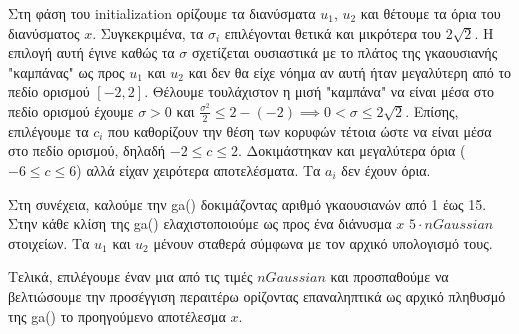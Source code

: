 

Στη φάση του initialization ορίζουμε τα διανύσματα $u_1$, $u_2$ και θέτουμε τα όρια του διανύσματος $x$. 
Συγκεκριμένα, τα $\sigma_{i}$ επιλέγονται θετικά και μικρότερα του $2\sqrt{2}$. 
Η επιλογή αυτή έγινε καθώς τα $\sigma$ σχετίζεται ουσιαστικά με το πλάτος της γκαουσιανής "καμπάνας" ως προς $u_1$ και $u_2$ και δεν θα είχε νόημα αν αυτή ήταν μεγαλύτερη από το πεδίο ορισμού $[-2, 2]$. 
Θέλουμε τουλάχιστον η μισή "καμπάνα" να είναι μέσα στο πεδίο ορισμού έχουμε $\sigma > 0$ και $\frac{\sigma^2}{2} \leq 2 - (-2) \implies 0 < \sigma \leq 2\sqrt{2}$. 
Επίσης, επιλέγουμε τα $c_i$ που καθορίζουν την θέση των κορυφών τέτοια ώστε να είναι μέσα στο πεδίο ορισμού, δηλαδή $-2 \leq c \leq 2$. Δοκιμάστηκαν και μεγαλύτερα όρια ($-6 \leq c \leq 6$) αλλά είχαν χειρότερα αποτελέσματα.
Τα $a_i$ δεν έχουν όρια.

Στη συνέχεια, καλούμε την ga() δοκιμάζοντας αριθμό γκαουσιανών από 1 έως 15.
Στην κάθε κλίση της ga() ελαχιστοποιούμε ως προς ένα διάνυσμα $x$ $5 \cdot nGaussian$ στοιχείων. 
Τα $u_1$ και $u_2$ μένουν σταθερά σύμφωνα με τον αρχικό υπολογισμό τους.

Τελικά, επιλέγουμε έναν μια από τις τιμές $nGaussian$ και προσπαθούμε να βελτιώσουμε την προσέγγιση περαιτέρω ορίζοντας επαναληπτικά ως αρχικό πληθυσμό της ga() το προηγούμενο αποτέλεσμα $x$.